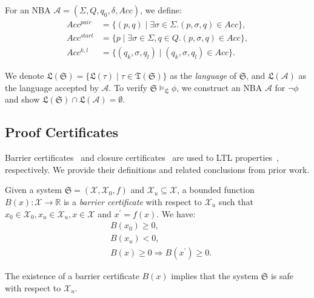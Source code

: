 For an NBA $\mathcal{A} = (\Sigma, Q, q_0, \delta, Acc)$, we define:
\begin{align}
  Acc^{pair} &= \{(p, q) \mid \exists \sigma \in \Sigma. (p, \sigma, q) \in Acc \}, \label{atpair}\\
  Acc^{start} &= \{p \mid \exists \sigma \in \Sigma, q \in Q. (p, \sigma, q) \in Acc \}, \label{atstart}\\
  Acc^{k, l} &= \{(q_k, \sigma, q_l) \mid (q_k, \sigma, q_l) \in Acc \}. \label{atkl}
\end{align}

We denote $\mathfrak{L}(\mathfrak{S}) = \{\mathfrak{L}(\tau) \mid \tau \in \mathfrak{T}(\mathfrak{S})\}$ as the \emph{language} of $\mathfrak{S}$, and $\mathfrak{L}(\mathcal{A})$ as the language accepted by $\mathcal{A}$. To verify $\mathfrak{S} \models_{\mathfrak{L}} \phi$, we construct an NBA $\mathcal{A}$ for $\neg \phi$ and show $\mathfrak{L}(\mathfrak{S}) \cap \mathfrak{L}(\mathcal{A}) = \emptyset$.

\subsection{Proof Certificates}
Barrier certificates~\cite{prajna2004safety} and closure certificates~\cite{murali2024closure} are used to LTL properties~\cite{wongpiromsarn2015automata,murali2024closure}, respectively. We provide their definitions and related conclusions from prior work.

\begin{definition}
  \label{SCDEF}
  Given a system $\mathfrak{S} = (\mathcal{X}, \mathcal{X}_0, f)$ and $\mathcal{X}_{u} \subseteq \mathcal{X}$, a bounded function $B(x): \mathcal{X} \rightarrow \mathbb{R}$ is a \emph{barrier certificate} with respect to $\mathcal{X}_{u}$ such that $x_0 \in \mathcal{X}_0, x_u \in \mathcal{X}_u, x \in \mathcal{X}$ and $x^{\prime} = f(x)$. We have:
  \begin{align}
    &B(x_0) \geq 0, \label{bsinn0} \\ %
    &B(x_u) < 0, \label{bsun0} \\ %
    &B(x) \geq 0 \Rightarrow B(x^{\prime}) \geq 0. \label{bstnn0} %
  \end{align}
\end{definition}
\begin{theorem}
  \label{corollary_tbsc}
  The existence of a barrier certificate \( B(x) \)  implies that the system $\mathfrak{S}$ is safe with respect to $\mathcal{X}_u$.
\end{theorem}

